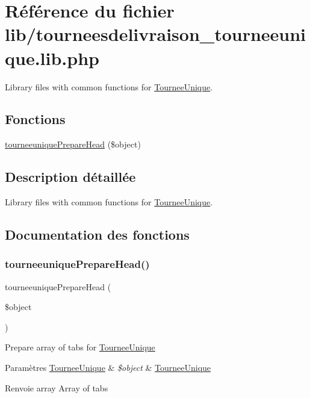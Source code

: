 \hypertarget{tourneesdelivraison__tourneeunique_8lib_8php}{}\section{Référence du fichier lib/tourneesdelivraison\+\_\+tourneeunique.lib.\+php}
\label{tourneesdelivraison__tourneeunique_8lib_8php}


Library files with common functions for \hyperlink{classTourneeUnique}{Tournee\+Unique}.  


\subsection*{Fonctions}
\begin{DoxyCompactItemize}
\item 
\hyperlink{tourneesdelivraison__tourneeunique_8lib_8php_aa4b8eeb3b6518df5bc56f0bf36c1ab7f}{tourneeunique\+Prepare\+Head} (\$object)
\end{DoxyCompactItemize}


\subsection{Description détaillée}
Library files with common functions for \hyperlink{classTourneeUnique}{Tournee\+Unique}. 



\subsection{Documentation des fonctions}
\mbox{\label{tourneesdelivraison__tourneeunique_8lib_8php_aa4b8eeb3b6518df5bc56f0bf36c1ab7f}} 
\subsubsection{\texorpdfstring{tourneeunique\+Prepare\+Head()}{tourneeuniquePrepareHead()}}
{\footnotesize\ttfamily tourneeunique\+Prepare\+Head (\begin{DoxyParamCaption}\item[{}]{\$object }\end{DoxyParamCaption})}

Prepare array of tabs for \hyperlink{classTourneeUnique}{Tournee\+Unique}


\begin{DoxyParams}[1]{Paramètres}
\hyperlink{classTourneeUnique}{Tournee\+Unique} & {\em \$object} & \hyperlink{classTourneeUnique}{Tournee\+Unique} \\
\hline
\end{DoxyParams}
\begin{DoxyReturn}{Renvoie}
array Array of tabs 
\end{DoxyReturn}
